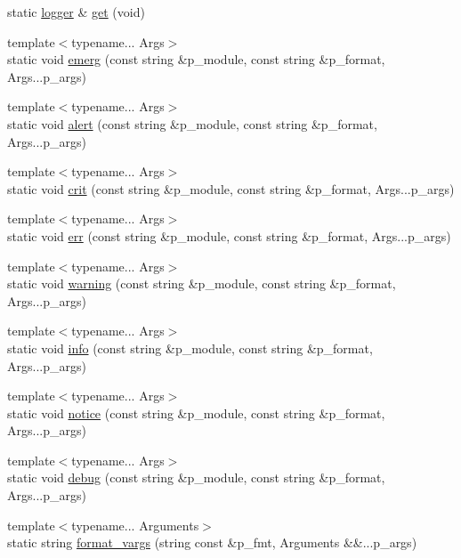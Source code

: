 \begin{DoxyCompactItemize}
\item 
static \hyperlink{classxtd_1_1logger}{logger} \& \hyperlink{classxtd_1_1logger_a21511dfdad9ec1e88c3444637a000e9d}{get} (void)
\item 
{\footnotesize template$<$typename... Args$>$ }\\static void \hyperlink{classxtd_1_1logger_a07697b74619641014fb6e51130b5c837}{emerg} (const string \&p\+\_\+module, const string \&p\+\_\+format, Args...\+p\+\_\+args)
\item 
{\footnotesize template$<$typename... Args$>$ }\\static void \hyperlink{classxtd_1_1logger_abea0d6d16f6138d94e9373457fa08513}{alert} (const string \&p\+\_\+module, const string \&p\+\_\+format, Args...\+p\+\_\+args)
\item 
{\footnotesize template$<$typename... Args$>$ }\\static void \hyperlink{classxtd_1_1logger_a1725596996a6060db5055c499c9ec9d1}{crit} (const string \&p\+\_\+module, const string \&p\+\_\+format, Args...\+p\+\_\+args)
\item 
{\footnotesize template$<$typename... Args$>$ }\\static void \hyperlink{classxtd_1_1logger_a20f991c43e729cf84d5d5294b947091e}{err} (const string \&p\+\_\+module, const string \&p\+\_\+format, Args...\+p\+\_\+args)
\item 
{\footnotesize template$<$typename... Args$>$ }\\static void \hyperlink{classxtd_1_1logger_a7432d0a490aef6bfe2de6f5ff5b77c06}{warning} (const string \&p\+\_\+module, const string \&p\+\_\+format, Args...\+p\+\_\+args)
\item 
{\footnotesize template$<$typename... Args$>$ }\\static void \hyperlink{classxtd_1_1logger_ac6cf4c5d929c844041ea9763cc3926be}{info} (const string \&p\+\_\+module, const string \&p\+\_\+format, Args...\+p\+\_\+args)
\item 
{\footnotesize template$<$typename... Args$>$ }\\static void \hyperlink{classxtd_1_1logger_a74886bf7a5d2bb1f2b2bf0265b13b38b}{notice} (const string \&p\+\_\+module, const string \&p\+\_\+format, Args...\+p\+\_\+args)
\item 
{\footnotesize template$<$typename... Args$>$ }\\static void \hyperlink{classxtd_1_1logger_a53a77a287f7a29d9585898dcff910254}{debug} (const string \&p\+\_\+module, const string \&p\+\_\+format, Args...\+p\+\_\+args)
\item 
{\footnotesize template$<$typename... Arguments$>$ }\\static string \hyperlink{classxtd_1_1logger_a169ce6459fe906cb5f840bdf2669e8ce}{format\+\_\+vargs} (string const \&p\+\_\+fmt, Arguments \&\&...p\+\_\+args)
\end{DoxyCompactItemize}


